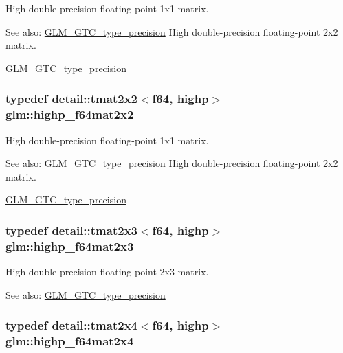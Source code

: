 High double-precision floating-point 1x1 matrix. \begin{Desc}
\item[See also:]\hyperlink{group__gtc__type__precision}{GLM\_\-GTC\_\-type\_\-precision} High double-precision floating-point 2x2 matrix. 

\hyperlink{group__gtc__type__precision}{GLM\_\-GTC\_\-type\_\-precision} \end{Desc}
\hypertarget{group__gtc__type__precision_g4babca568fc88f185620c02e4fdac0d8}{
\subsubsection[highp\_\-f64mat2x2]{\setlength{\rightskip}{0pt plus 5cm}typedef detail::tmat2x2$<$f64, highp$>$ {\bf glm::highp\_\-f64mat2x2}}}
\label{group__gtc__type__precision_g4babca568fc88f185620c02e4fdac0d8}


High double-precision floating-point 1x1 matrix. \begin{Desc}
\item[See also:]\hyperlink{group__gtc__type__precision}{GLM\_\-GTC\_\-type\_\-precision} High double-precision floating-point 2x2 matrix. 

\hyperlink{group__gtc__type__precision}{GLM\_\-GTC\_\-type\_\-precision} \end{Desc}
\hypertarget{group__gtc__type__precision_gfb5b42b29b3bd7f1605483223fa35312}{
\subsubsection[highp\_\-f64mat2x3]{\setlength{\rightskip}{0pt plus 5cm}typedef detail::tmat2x3$<$f64, highp$>$ {\bf glm::highp\_\-f64mat2x3}}}
\label{group__gtc__type__precision_gfb5b42b29b3bd7f1605483223fa35312}


High double-precision floating-point 2x3 matrix. \begin{Desc}
\item[See also:]\hyperlink{group__gtc__type__precision}{GLM\_\-GTC\_\-type\_\-precision} \end{Desc}
\hypertarget{group__gtc__type__precision_g72fae79e6633cbc6bf691f69278b36d3}{
\subsubsection[highp\_\-f64mat2x4]{\setlength{\rightskip}{0pt plus 5cm}typedef detail::tmat2x4$<$f64, highp$>$ {\bf glm::highp\_\-f64mat2x4}}}
\label{group__gtc__type__precision_g72fae79e6633cbc6bf691f69278b36d3}



